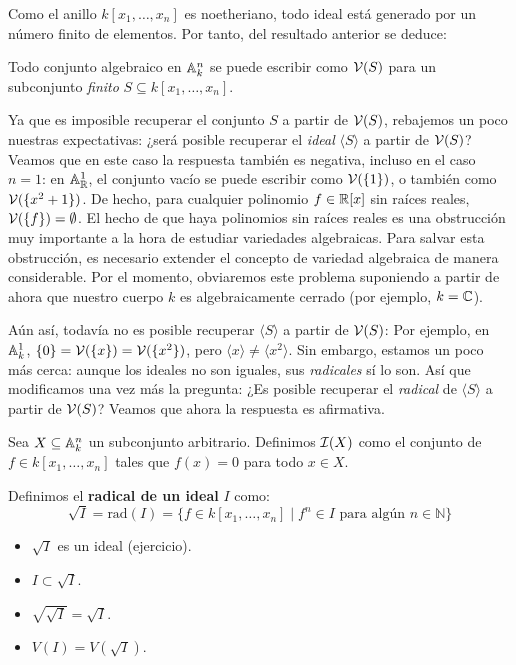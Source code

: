 \documentclass[ACGA.tex]{subfiles}
\begin{document}
Como el anillo $k[x_1,\ldots,x_n]$ es noetheriano, todo ideal está generado por un número finito de elementos. Por tanto, del resultado anterior se deduce:

\begin{coro}
 Todo conjunto algebraico en $\mathbb{A}^n_k$ se puede escribir como $\mathcal{V}(S)$ para un subconjunto \emph{finito} $S\subseteq k[x_1,\ldots,x_n]$.
\end{coro}

Ya que es imposible recuperar el conjunto $S$ a partir de $\mathcal{V}(S)$, rebajemos un poco nuestras expectativas: ¿será posible recuperar el \emph{ideal} $\langle S\rangle$ a partir de $\mathcal{V}(S)$? Veamos que en este caso la respuesta también es negativa, incluso en el caso $n=1$: en $\mathbb{A}^1_{\mathbb{R}}$, el conjunto vacío se puede escribir como $\mathcal{V}(\{1\})$, o también como $\mathcal{V}(\{x^2+1\})$. De hecho, para cualquier polinomio $f\in \mathbb{R}[x]$ sin raíces reales, $\mathcal{V}(\{f\})=\emptyset$. El hecho de que haya polinomios sin raíces reales es una obstrucción muy importante a la hora de estudiar variedades algebraicas. Para salvar esta obstrucción, es necesario extender el concepto de variedad algebraica de manera considerable. Por el momento, obviaremos este problema suponiendo a partir de ahora que nuestro cuerpo $k$ es algebraicamente cerrado (por ejemplo, $k=\mathbb{C}$).

Aún así, todavía no es posible recuperar $\langle S\rangle$ a partir de $\mathcal{V}(S)$: Por ejemplo, en $\mathbb{A}^1_k$, $\{0\}=\mathcal{V}(\{x\})=\mathcal{V}(\{x^2\})$, pero $\langle x\rangle\neq\langle x^2\rangle$. Sin embargo, estamos un poco más cerca: aunque los ideales no son iguales, sus \emph{radicales} sí lo son. Así que modificamos una vez más la pregunta: ¿Es posible recuperar el \emph{radical} de $\langle S\rangle$ a partir de $\mathcal{V}(S)$? Veamos que ahora la respuesta es afirmativa.

Sea $X\subseteq \mathbb{A}^n_k$ un subconjunto arbitrario. Definimos $\mathcal{I}(X)$ como el conjunto de $f\in k[x_1,\ldots,x_n]$ tales que $f(x)=0$ para todo $x\in X$. 

\begin{defi}
Definimos el \textbf{radical de un ideal} $I$ como:
\[ \sqrt{I} = \text{rad}(I) = \{f \in k[x_1,\dots,x_n] \mid f^n \in I \text{ para algún }n \in \mathbb{N}\} \]
\end{defi}

\begin{propi}\mbox{}
\begin{itemize}
	\item $\sqrt{I}$ es un ideal (ejercicio).
	\item $I \subset \sqrt{I}$.
	\item $\sqrt{\sqrt{I}} = \sqrt{I}$.
	\item $V(I) = V(\sqrt{I})$.
\end{itemize}
\end{propi}
\end{document}
